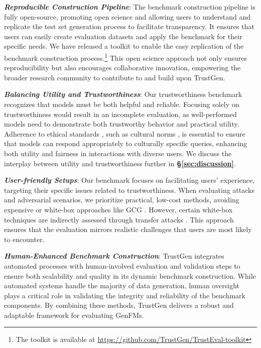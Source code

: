 \textbf{\textit{Reproducible Construction Pipeline}}: The benchmark construction pipeline is fully open-source, promoting open science and allowing users to understand and replicate the test set generation process to facilitate transparency\cite{cohen2022facilitating}. It ensures that users can easily create evaluation datasets and apply the benchmark for their specific needs. We have released a toolkit to enable the easy replication of the benchmark construction process.\footnote{The toolkit is available at \url{https://github.com/TrustGen/TrustEval-toolkit}} This open science approach not only ensures reproducibility but also encourages collaborative innovation, empowering the broader research community to contribute to and build upon TrustGen.

\textbf{\textit{Balancing Utility and Trustworthiness}}: Our trustworthiness benchmark recognizes that models must be both helpful and reliable. Focusing solely on trustworthiness would result in an incomplete evaluation, as well-performed models need to demonstrate both trustworthy behavior and practical utility. Adherence to ethical standards \cite{Wikipedia_Machine_Ethics}, such as cultural norms \cite{shi2024culturebank}, is essential to ensure that models can respond appropriately to culturally specific queries, enhancing both utility and fairness in interactions with diverse users. We discuss the interplay between utility and trustworthiness further in \textbf{\S\ref{sec:discussion}}.

\textbf{\textit{User-friendly Setups}}: Our benchmark focuses on facilitating users' experience, targeting their specific issues related to trustworthiness. When evaluating attacks and adversarial scenarios, we prioritize practical, low-cost methods, avoiding expensive or white-box approaches like GCG \cite{zou2023universal}. However, certain white-box techniques are indirectly assessed through transfer attacks \cite{shayegani2023jailbreak}. This approach ensures that the evaluation mirrors realistic challenges that users are most likely to encounter.

\textbf{\textit{Human-Enhanced Benchmark Construction}}: TrustGen integrates automated processes with human-involved evaluation and validation steps to ensure both scalability and quality in its dynamic benchmark construction. While automated systems handle the majority of data generation, human oversight plays a critical role in validating the integrity and reliability of the benchmark components. By combining these methods, TrustGen delivers a robust and adaptable framework for evaluating GenFMs.


